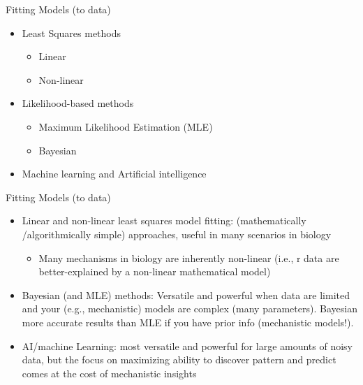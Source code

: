 \documentclass[xcolor=x11names,compress]{beamer}
\renewcommand{\(}{\begin{columns}}
\renewcommand{\)}{\end{columns}}
\newcommand{\<}[1]{\begin{column}{#1}}
\renewcommand{\>}{\end{column}}
\begin{document}
\begin{frame}{Fitting Models (to data)}

\begin{itemize}\itemsep16pt

	\item Least Squares methods
	\begin{itemize}
		 \item Linear 
		 \item Non-linear
	\end{itemize}
	\item Likelihood-based methods 
	\begin{itemize}
	 \item Maximum Likelihood Estimation (MLE) 
	 \item Bayesian
	\end{itemize}
	\item Machine learning and Artificial intelligence

\end{itemize}

\end{frame}

\begin{frame}{Fitting Models (to data)}

\begin{itemize} \itemsep12pt
	
\item Linear and non-linear least squares model fitting:  (mathematically /algorithmically simple) approaches, useful in many scenarios in biology 
\begin{itemize}
	\item Many mechanisms in biology are inherently non-linear (i.e., r data are better-explained by a non-linear mathematical model)
\end{itemize} 

\item Bayesian (and MLE) methods: Versatile and powerful when data are limited and your (e.g., mechanistic) models are complex (many parameters). Bayesian  more accurate results than MLE if you have prior info (mechanistic models!). 

\item AI/machine Learning: most versatile and powerful for large amounts of noisy data, but the focus on maximizing ability to discover pattern and predict comes at the cost of mechanistic insights


\end{itemize}

\end{frame}
\end{document}
